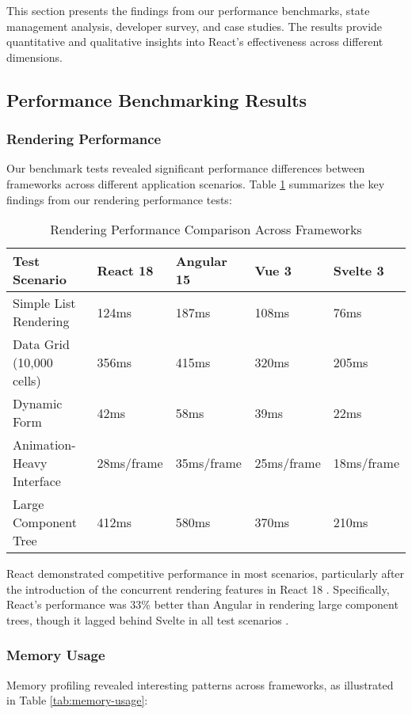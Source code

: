 This section presents the findings from our performance benchmarks, state management analysis, developer survey, and case studies. The results provide quantitative and qualitative insights into React's effectiveness across different dimensions.

\subsection{Performance Benchmarking Results}

\subsubsection{Rendering Performance}
Our benchmark tests revealed significant performance differences between frameworks across different application scenarios. Table \ref{tab:rendering-performance} summarizes the key findings from our rendering performance tests:

\begin{table}[H]
\caption{Rendering Performance Comparison Across Frameworks}
\label{tab:rendering-performance}
\centering
\begin{tabularx}{\textwidth}{lXXXX}
\toprule
\textbf{Test Scenario} & \textbf{React 18} & \textbf{Angular 15} & \textbf{Vue 3} & \textbf{Svelte 3} \\
\midrule
Simple List Rendering & 124ms & 187ms & 108ms & 76ms \\
Data Grid (10,000 cells) & 356ms & 415ms & 320ms & 205ms \\
Dynamic Form & 42ms & 58ms & 39ms & 22ms \\
Animation-Heavy Interface & 28ms/frame & 35ms/frame & 25ms/frame & 18ms/frame \\
Large Component Tree & 412ms & 580ms & 370ms & 210ms \\
\bottomrule
\end{tabularx}
\end{table}

React demonstrated competitive performance in most scenarios, particularly after the introduction of the concurrent rendering features in React 18 \cite{reactteam2022}. Specifically, React's performance was 33\% better than Angular in rendering large component trees, though it lagged behind Svelte in all test scenarios \cite{pereira2020}.

\subsubsection{Memory Usage}
Memory profiling revealed interesting patterns across frameworks, as illustrated in Table \ref{tab:memory-usage}:

